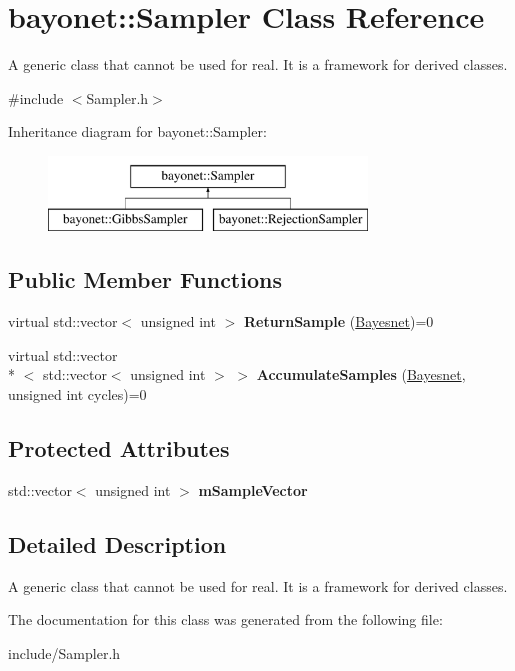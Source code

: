 \hypertarget{classbayonet_1_1_sampler}{\section{bayonet\-:\-:Sampler Class Reference}
\label{classbayonet_1_1_sampler}
}


A generic class that cannot be used for real. It is a framework for derived classes.  




{\ttfamily \#include $<$Sampler.\-h$>$}

Inheritance diagram for bayonet\-:\-:Sampler\-:\begin{figure}[H]
\begin{center}
\leavevmode
\includegraphics[height=2.000000cm]{classbayonet_1_1_sampler}
\end{center}
\end{figure}
\subsection*{Public Member Functions}
\begin{DoxyCompactItemize}
\item 
\hypertarget{classbayonet_1_1_sampler_a9fa53ea7b8204609e8bb2c02108445d5}{virtual std\-::vector$<$ unsigned int $>$ {\bfseries Return\-Sample} (\hyperlink{classbayonet_1_1_bayesnet}{Bayesnet})=0}\label{classbayonet_1_1_sampler_a9fa53ea7b8204609e8bb2c02108445d5}

\item 
\hypertarget{classbayonet_1_1_sampler_abf228d4fb18fb05d38e2394cce020007}{virtual std\-::vector\\*
$<$ std\-::vector$<$ unsigned int $>$ $>$ {\bfseries Accumulate\-Samples} (\hyperlink{classbayonet_1_1_bayesnet}{Bayesnet}, unsigned int cycles)=0}\label{classbayonet_1_1_sampler_abf228d4fb18fb05d38e2394cce020007}

\end{DoxyCompactItemize}
\subsection*{Protected Attributes}
\begin{DoxyCompactItemize}
\item 
\hypertarget{classbayonet_1_1_sampler_a87272da95dcc8028a13384931eda0d81}{std\-::vector$<$ unsigned int $>$ {\bfseries m\-Sample\-Vector}}\label{classbayonet_1_1_sampler_a87272da95dcc8028a13384931eda0d81}

\end{DoxyCompactItemize}


\subsection{Detailed Description}
A generic class that cannot be used for real. It is a framework for derived classes. 

The documentation for this class was generated from the following file\-:\begin{DoxyCompactItemize}
\item 
include/Sampler.\-h\end{DoxyCompactItemize}
